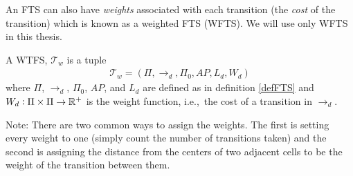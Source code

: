 An FTS can also have \textit{weights} associated with each transition (the \textit{cost} of the transition) which is known as a weighted FTS (WFTS). We will use only WFTS in this thesis.
\begin{definition}
\label{defWFTS}
A WTFS, $\mathcal{T}_w$ is a tuple 
\begin{align}
\mathcal{T}_w = (\Pi, \rightarrow_d, \Pi_0, AP,L_d,W_d)
\end{align}
where $\Pi$, $\rightarrow_d$, $\Pi_0$, $AP$, and $L_d$ are defined as in definition \ref{defFTS} and $W_d: \Pi \times \Pi \rightarrow \mathbb{R}^+$ is the weight function, i.e.,\ the cost of a transition in $\rightarrow_d$. 
\end{definition}
Note: There are two common ways to assign the weights. The first is setting every weight to one (simply count the number of transitions taken) and the second is assigning the distance from the centers of two adjacent cells to be the weight of the transition between them. 

